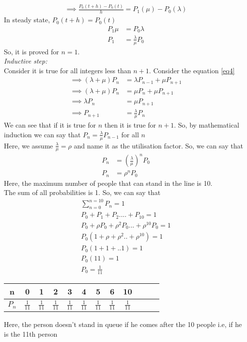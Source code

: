 \documentclass[journal,12pt,twocolumn]{IEEEtran}
\begin{document}
\begin{align}
    \implies \frac{P_0(t+h)-P_0(t)}{h}=P_1(\mu)-P_0(\lambda)
\end{align}
In steady state, $P_0(t+h)=P_0(t)$
\begin{align}
    P_1 \mu &=P_0 \lambda\\
    P_1&= \frac{\lambda}{\mu} P_0
\end{align}
So, it is proved for $n=1$.\\
\textit{Inductive step:}\\
Consider it is true for all integers less than $n+1$.
Consider the equation \eqref{eq4}
\begin{align}
    \implies (\lambda + \mu)P_n&=\lambda P_{n-1} + \mu P_{n+1}\\
    \implies (\lambda + \mu)P_n&= \mu P_n + \mu P_{n+1}\\
    \implies \lambda P_n &= \mu P_{n+1}\\
    \implies P_{n+1}&=\frac{\lambda}{\mu}P_n
\end{align}
We can see that if it is true for $n$ then it is true for $n+1$. So, by mathematical induction we can say that $P_n=\frac{\lambda}{\mu}P_{n-1}$ for all $n$ \\
Here, we assume $\frac{\lambda}{\mu}=\rho$ and name it as the utilisation factor.
So, we can say that 
\begin{align}
    P_n &= \left(\frac{\lambda}{\mu}\right)^n P_0\\
    P_n &= \rho^n P_0
\end{align}
Here, the maximum number of people that can stand in the line is 10.\\
The sum of all probabilities is 1. So, we can say that
\begin{align}
    \sum_{n=0}^{n=10}P_{n}=1\\
    P_{0}+P_{1}+P_{2}....+P_{10}=1\\
    P_{0}+\rho P_{0}+\rho^2P_{0}...+\rho^10P_{0}=1\\
    P_{0}(1+\rho+\rho^2..+\rho^{10})=1\\
    P_{0}(1+1+..1)=1\\
    P_{0}(11)=1\\
    P_{0}=\frac{1}{11}
\end{align}
\begin{table}[h!]
    \centering
    \begin{tabular}{|c|c|c|c|c|c|c|c|c|c|c|c|}
        \hline
        n & 0 & 1 & 2 & 3 & 4 & 5 & 6 & 10\\
        \hline
        $P_n$ & $\frac{1}{11}$& $\frac{1}{11}$ & $\frac{1}{11}$& $\frac{1}{11}$ & $\frac{1}{11}$& $\frac{1}{11}$ & $\frac{1}{11}$&  $\frac{1}{11}$\\
        \hline
    \end{tabular}
    \label{tab:my_label}
\end{table}
Here, the person doesn't stand in queue if he comes after the 10 people i.e, if he is the 11th person\\
\end{document}
